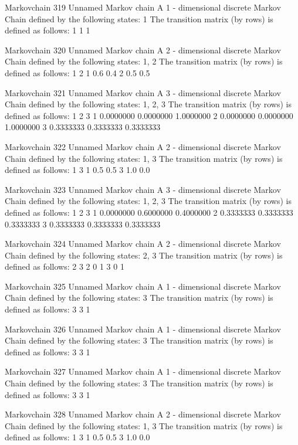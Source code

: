 \documentclass[
  nojss]{jss}
\begin{document}
\begin{CodeChunk}
\begin{CodeOutput}
Markovchain  319 
Unnamed Markov chain 
 A  1 - dimensional discrete Markov Chain defined by the following states: 
 1 
 The transition matrix  (by rows)  is defined as follows: 
  1
1 1

Markovchain  320 
Unnamed Markov chain 
 A  2 - dimensional discrete Markov Chain defined by the following states: 
 1, 2 
 The transition matrix  (by rows)  is defined as follows: 
    1   2
1 0.6 0.4
2 0.5 0.5

Markovchain  321 
Unnamed Markov chain 
 A  3 - dimensional discrete Markov Chain defined by the following states: 
 1, 2, 3 
 The transition matrix  (by rows)  is defined as follows: 
          1         2         3
1 0.0000000 0.0000000 1.0000000
2 0.0000000 0.0000000 1.0000000
3 0.3333333 0.3333333 0.3333333

Markovchain  322 
Unnamed Markov chain 
 A  2 - dimensional discrete Markov Chain defined by the following states: 
 1, 3 
 The transition matrix  (by rows)  is defined as follows: 
    1   3
1 0.5 0.5
3 1.0 0.0

Markovchain  323 
Unnamed Markov chain 
 A  3 - dimensional discrete Markov Chain defined by the following states: 
 1, 2, 3 
 The transition matrix  (by rows)  is defined as follows: 
          1         2         3
1 0.0000000 0.6000000 0.4000000
2 0.3333333 0.3333333 0.3333333
3 0.3333333 0.3333333 0.3333333

Markovchain  324 
Unnamed Markov chain 
 A  2 - dimensional discrete Markov Chain defined by the following states: 
 2, 3 
 The transition matrix  (by rows)  is defined as follows: 
  2 3
2 0 1
3 0 1

Markovchain  325 
Unnamed Markov chain 
 A  1 - dimensional discrete Markov Chain defined by the following states: 
 3 
 The transition matrix  (by rows)  is defined as follows: 
  3
3 1

Markovchain  326 
Unnamed Markov chain 
 A  1 - dimensional discrete Markov Chain defined by the following states: 
 3 
 The transition matrix  (by rows)  is defined as follows: 
  3
3 1

Markovchain  327 
Unnamed Markov chain 
 A  1 - dimensional discrete Markov Chain defined by the following states: 
 3 
 The transition matrix  (by rows)  is defined as follows: 
  3
3 1

Markovchain  328 
Unnamed Markov chain 
 A  2 - dimensional discrete Markov Chain defined by the following states: 
 1, 3 
 The transition matrix  (by rows)  is defined as follows: 
    1   3
1 0.5 0.5
3 1.0 0.0


\end{CodeOutput}
\end{CodeChunk}
\end{document}
